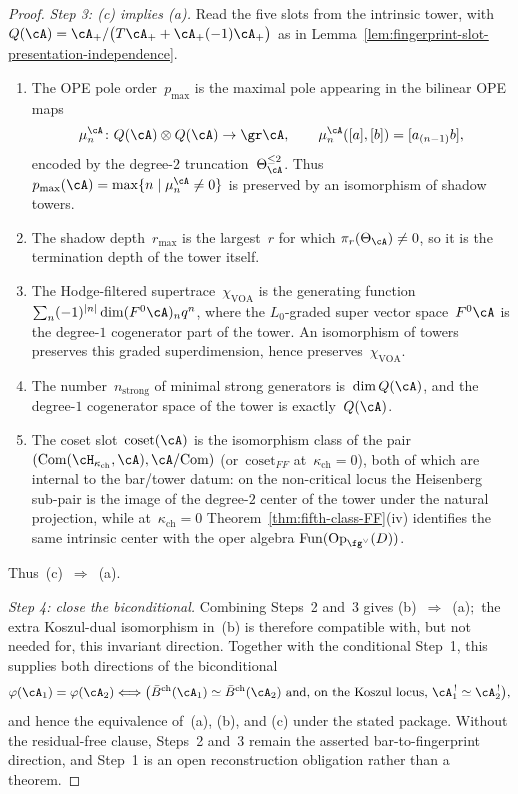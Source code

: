\begin{proof}
\emph{Step 3: \textup{(c)} implies \textup{(a)}.}
Read the five slots from the intrinsic tower, with
$Q(\cA)=\cA_+/\bigl(T\cA_+ + \cA_+(-1)\cA_+\bigr)$ as in
Lemma~\ref{lem:fingerprint-slot-presentation-independence}.
\begin{enumerate}[label=\textup{(\arabic*)},leftmargin=*]
\item The OPE pole order~$p_{\max}$ is the maximal pole appearing in
the bilinear OPE maps
\[
\mu_n^\cA\colon Q(\cA)\otimes Q(\cA)\to \gr\cA,
\qquad
\mu_n^\cA([a],[b])=[a_{(n-1)}b],
\]
encoded by the degree-$2$ truncation~$\Theta_\cA^{\leq 2}$. Thus
$p_{\max}(\cA)=\max\{n\mid \mu_n^\cA\neq 0\}$ is preserved by an
isomorphism of shadow towers.
\item The shadow depth~$r_{\max}$ is the largest~$r$ for which
$\pi_r(\Theta_\cA)\neq 0$, so it is the termination depth of the tower
itself.
\item The Hodge-filtered supertrace~$\chi_{\mathrm{VOA}}$ is
the generating function
$\sum_n (-1)^{|n|}\dim(F^0\cA)_n q^n$, where the
$L_0$-graded super vector space~$F^0\cA$ is the degree-$1$ cogenerator
part of the tower. An isomorphism of towers preserves this graded
superdimension, hence preserves~$\chi_{\mathrm{VOA}}$.
\item The number~$n_{\mathrm{strong}}$ of minimal strong generators
is~$\dim Q(\cA)$, and the degree-$1$ cogenerator space of the tower is
exactly~$Q(\cA)$.
\item The coset slot~$\mathrm{coset}(\cA)$ is the isomorphism class
of the pair
$(\mathrm{Com}(\cH_{\kappa_{\mathrm{ch}}},\cA),\cA/\mathrm{Com})$
\textup{(}or~$\mathrm{coset}_{FF}$ at~$\kappa_{\mathrm{ch}}=0$\textup{)},
both of which are internal to the bar/tower datum: on the non-critical
locus the Heisenberg sub-pair is the image of the degree-$2$ center of
the tower under the natural projection, while at~$\kappa_{\mathrm{ch}}=0$
Theorem~\ref{thm:fifth-class-FF}(iv) identifies the same intrinsic
center with the oper algebra
$\operatorname{Fun}(\mathrm{Op}_{\fg^\vee}(D))$.
\end{enumerate}
Thus~\textup{(c)}~$\Rightarrow$~\textup{(a)}.

\emph{Step 4: close the biconditional.}
Combining Steps~2 and~3 gives
\textup{(b)}~$\Rightarrow$~\textup{(a)}$;$ the extra Koszul-dual
isomorphism in~\textup{(b)} is therefore compatible with, but not needed
for, this invariant direction. Together with the conditional
Step~1, this supplies both directions of the biconditional
\[
\varphi(\cA_1)=\varphi(\cA_2)
\Longleftrightarrow
\bigl(
\bar{B}^{\mathrm{ch}}(\cA_1)\simeq \bar{B}^{\mathrm{ch}}(\cA_2)
\text{ and, on the Koszul locus, }
\cA_1^{\,!}\simeq \cA_2^{\,!}
\bigr),
\]
and hence the equivalence of~\textup{(a)}, \textup{(b)}, and
\textup{(c)} under the stated package. Without the residual-free
clause, Steps~2 and~3 remain the asserted bar-to-fingerprint
direction, and Step~1 is an open reconstruction obligation rather
than a theorem.
\end{proof}

